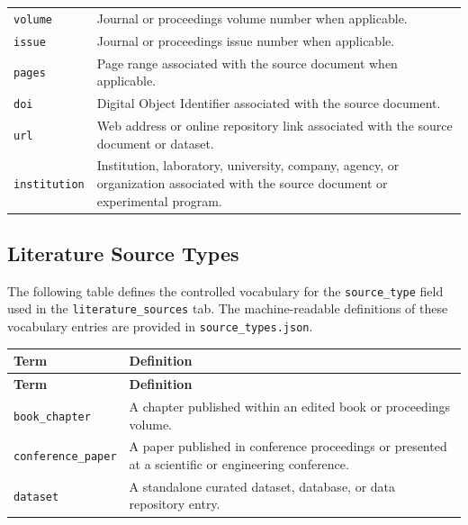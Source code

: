 \documentclass[11pt]{book}
\begin{document}
{\begin{longtable}{p{}p{}}
\texttt{volume} &
Journal or proceedings volume number when applicable. \\

\texttt{issue} &
Journal or proceedings issue number when applicable. \\

\texttt{pages} &
Page range associated with the source document when applicable. \\

\texttt{doi} &
Digital Object Identifier associated with the source document. \\

\texttt{url} &
Web address or online repository link associated with the source document or dataset. \\

\texttt{institution} &
Institution, laboratory, university, company, agency, or organization associated with the source document or experimental program. \\

\hline
\end{longtable}

\subsection{Literature Source Types}
\label{vocab:source_type_list}

The following table defines the controlled vocabulary for the \texttt{source\_type} field used in the \texttt{literature\_sources} tab. The machine-readable definitions of these vocabulary entries are provided in \texttt{source\_types.json}. 

\begin{longtable}{p{}p{}}
\hline
\textbf{Term} & \textbf{Definition} \\
\hline
\endfirsthead

\hline
\textbf{Term} & \textbf{Definition} \\
\hline
\endhead

\texttt{book\_chapter} &
A chapter published within an edited book or proceedings volume. \\

\texttt{conference\_paper} &
A paper published in conference proceedings or presented at a scientific or engineering conference. \\

\texttt{dataset} &
A standalone curated dataset, database, or data repository entry. \\


\end{longtable}}
\end{document}
